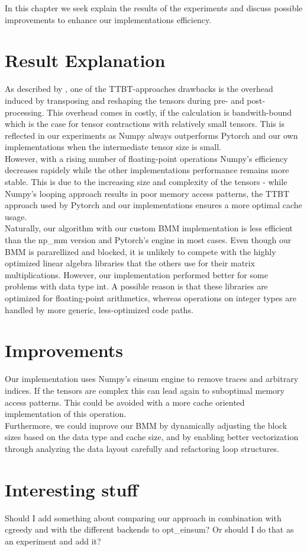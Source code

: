 In this chapter we seek explain the results of the experiments and discuss possible improvements to enhance our implementations efficiency.\\

\section{Result Explanation}
As described by \textcite{springer}, one of the TTBT-approaches drawbacks is the overhead induced by transposing and reshaping the tensors during pre- and post-processing. This overhead comes in costly, if the calculation is bandwith-bound which is the case for tensor contractions with relatively small tensors. This is reflected in our experiments as Numpy always outperforms Pytorch and our own implementations when the intermediate tensor size is small.\\
However, with a rising number of floating-point operations Numpy's efficiency decreases rapidely while the other implementations performance remains more stable. 
This is due to the increasing size and complexity of the tensors - while Numpy's looping approach results in poor memory access patterns, the TTBT approach used by Pytorch and our implementations ensures a more optimal cache usage.\\

\noindent Naturally, our algorithm with our custom BMM implementation is less efficient than the np\_mm version and Pytorch's engine in most cases. Even though our BMM is pararellized and blocked, it is unlikely to compete with the highly optimized linear algebra libraries that the others use for their matrix multiplications. However, our implementation performed better for some problems with data type int. A possible reason is that these libraries are optimized for floating-point arithmetics, whereas operations on integer types are handled by more generic, less-optimized code paths.\\

\section{Improvements}
Our implementation uses Numpy's einsum engine to remove traces and arbitrary indices. If the tensors are complex this can lead again to suboptimal memory access patterns. This could be avoided with a more cache oriented implementation of this operation.\\
Furthermore, we could improve our BMM by dynamically adjusting the block sizes based on the data type and cache size, and by enabling better vectorization through analyzing the data layout carefully and refactoring loop structures.

\section{Interesting stuff}
Should I add something about comparing our approach in combination with cgreedy and with the different backends to opt\_einsum? Or should I do that as an experiment and add it? 
